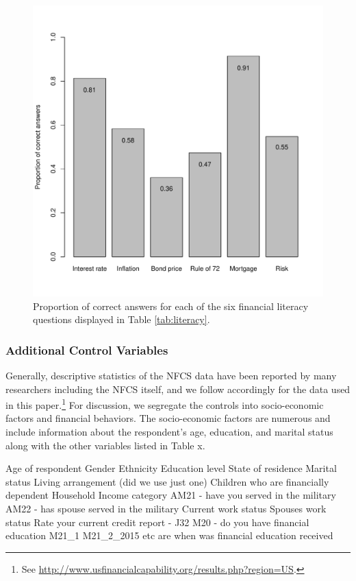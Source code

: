 \documentclass[12pt]{article}
\theoremstyle{plain}
\begin{document}
\begin{figure}[H]
\centering
\caption{Proportion of correct answers for each of the six financial literacy questions displayed in Table \ref{tab:literacy}.}
	\centerline{\includegraphics[scale=.6]{barplot_ind.pdf}}\label{indvar}
\end{figure}


\subsubsection{Additional Control Variables}

Generally, descriptive statistics of the NFCS data have been reported by many researchers including the NFCS itself, and we follow accordingly for the data used in this paper.\footnote{See \href{http://www.usfinancialcapability.org/results.php?region=US}{http://www.usfinancialcapability.org/results.php?region=US}.}  For discussion, we segregate the controls into socio-economic factors and financial behaviors.  The socio-economic factors are numerous and include information about the respondent's age, education, and marital status along with the other variables listed in Table x.

Age of respondent
Gender
Ethnicity
Education level
State of residence
Marital status
Living arrangement (did we use just one)
Children who are financially dependent
Household Income category
AM21 - have you served in the military
AM22 - has spouse served in the military
Current work status
Spouses work status
Rate your current credit report - J32
M20 - do you have financial education
M21\_1 M21\_2\_2015 etc are when was financial education received
\end{document}
